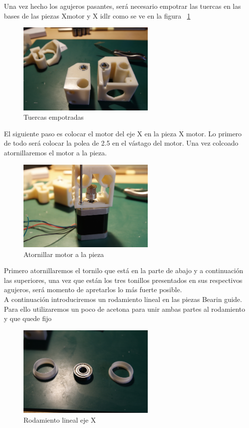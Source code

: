 			Una vez hecho los agujeros pasantes, será necesario empotrar las tuercas en las bases de las piezas Xmotor y X idlr como se ve en la figura ~\ref{fig:tuercas.empotradas}\\
			\begin{figure}[!htp]
				\centering
				\includegraphics[width=0.6\textwidth]{../../Fotos/50.jpg}
				\caption{Tuercas empotradas}
				\label{fig:tuercas.empotradas}
			\end{figure}
			El siguiente paso es colocar el motor del eje X en la pieza X motor. Lo primero de todo será colocar la polea de 2.5 en el vástago del motor. Una vez colcoado atornillaremos el motor a la pieza.\\
			\begin{figure}[!htp]
				\centering
				\includegraphics[width=0.6\textwidth]{../../Fotos/54.jpg}
				\caption{Atornillar motor a la pieza}
				\label{fig:motor.ejex}
			\end{figure}
			Primero atornillaremos el tornilo que está en la parte de abajo y a continuación las superiores, una vez que están los tres tonillos presentados en sus respectivos agujeros, será momento de apretarlos lo más fuerte posible.\\
			A continuación introduciremos un rodamiento lineal en las piezas Bearin guide. Para ello utilizaremos un poco de acetona para unir ambas partes al rodamiento y que quede fijo\\
			\begin{figure}[!htp]
				\centering
				\includegraphics[width=0.6\textwidth]{../../Fotos/55.jpg}
				\caption{Rodamiento lineal eje X}
				\label{fig:rodamiento.ejex}
			\end{figure}
